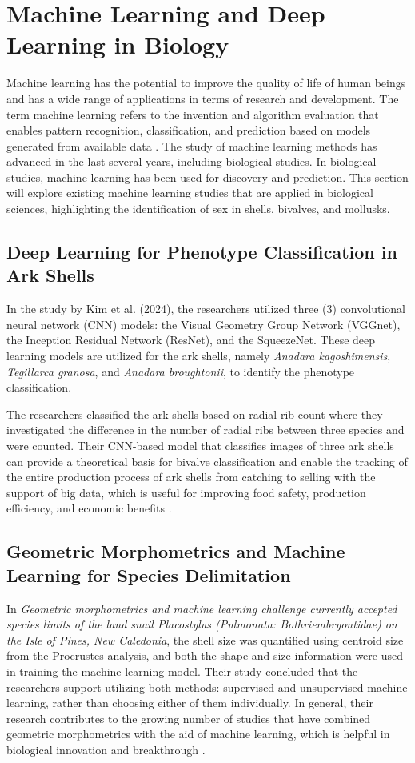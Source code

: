 {\section{Machine Learning and Deep Learning in Biology}
Machine learning has the potential to improve the quality of life of human beings and has a wide range of applications in terms of research and development. The term machine learning refers to the invention and algorithm evaluation that enables pattern recognition, classification, and prediction based on models generated from available data \cite{tarca2007}. The study of machine learning methods has advanced in the last several years, including biological studies. In biological studies, machine learning has been used for discovery and prediction. This section will explore existing machine learning studies that are applied in biological sciences, highlighting the identification of sex in shells, bivalves, and mollusks.
\vspace{-10pt}

\subsection{Deep Learning for Phenotype Classification in Ark Shells}
In the study by Kim et al. (2024), the researchers utilized three (3) convolutional neural network (CNN) models: the Visual Geometry Group Network (VGGnet), the Inception Residual Network (ResNet), and the SqueezeNet. These deep learning models are utilized for the ark shells, namely \textit{Anadara kagoshimensis}, \textit{Tegillarca granosa}, and \textit{Anadara broughtonii}, to identify the phenotype classification. 

The researchers classified the ark shells based on radial rib count where they investigated the difference in the number of radial ribs between three species and were counted. Their CNN-based model that classifies images of three ark shells can provide a theoretical basis for bivalve classification and enable the tracking of the entire production process of ark shells from catching to selling with the support of big data, which is useful for improving food safety, production efficiency, and economic benefits \cite{kim2024}.

\subsection{Geometric Morphometrics and Machine Learning for Species Delimitation}
In \textit{Geometric morphometrics and machine learning challenge currently accepted species limits of the land snail Placostylus (Pulmonata: Bothriembryontidae) on the Isle of Pines, New Caledonia}, the shell size was quantified using centroid size from the Procrustes analysis, and both the shape and size information were used in training the machine learning model. Their study concluded that the researchers support utilizing both methods: supervised and unsupervised machine learning, rather than choosing either of them individually. In general, their research contributes to the growing number of studies that have combined geometric morphometrics with the aid of machine learning, which is helpful in biological innovation and breakthrough \cite{quenu2020}.

}
